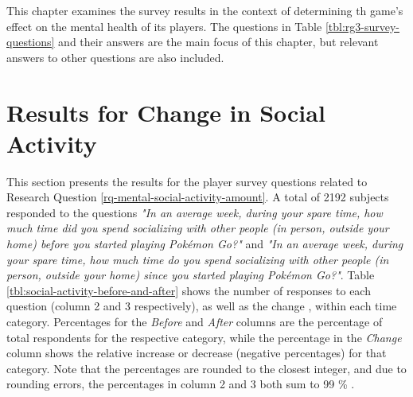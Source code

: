 This chapter examines the survey results in the context of determining th game's effect on the mental health of its players. The questions in Table \ref{tbl:rg3-survey-questions} and their answers are the main focus of this chapter, but relevant answers to other questions are also included.

\section{Results for Change in Social Activity}

This section presents the results for the player survey questions related to Research Question \ref{rq-mental-social-activity-amount}. A total of 2192 subjects responded to the questions \emph{"In an average week, during your spare time, how much time did you spend socializing with other people (in person, outside your home) before you started playing Pokémon Go?"} and \emph{"In an average week, during your spare time, how much time do you spend socializing with other people (in person, outside your home) since you started playing Pokémon Go?"}. Table \ref{tbl:social-activity-before-and-after} shows the number of responses to each question (column 2 and 3 respectively), as well as the change , within each time category. Percentages for the \emph{Before} and \emph{After} columns are the percentage of total respondents for the respective category, while the percentage in the \emph{Change} column shows the relative increase or decrease (negative percentages) for that category. Note that the percentages are rounded to the closest integer, and due to rounding errors, the percentages in column 2 and 3 both sum to 99 \% . 


